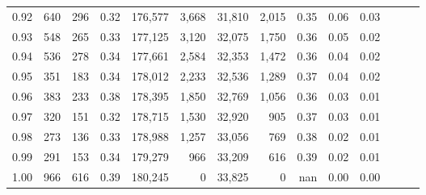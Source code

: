 \begin{tabular}{rrrrrrrrrrrrrr}
0.92 &    640 &  296 &  0.32 &  176,577 &    3,668 &  31,810 &   2,015 &  0.35 &  0.06 &      0.03 \\
0.93 &    548 &  265 &  0.33 &  177,125 &    3,120 &  32,075 &   1,750 &  0.36 &  0.05 &      0.02 \\
0.94 &    536 &  278 &  0.34 &  177,661 &    2,584 &  32,353 &   1,472 &  0.36 &  0.04 &      0.02 \\
0.95 &    351 &  183 &  0.34 &  178,012 &    2,233 &  32,536 &   1,289 &  0.37 &  0.04 &      0.02 \\
0.96 &    383 &  233 &  0.38 &  178,395 &    1,850 &  32,769 &   1,056 &  0.36 &  0.03 &      0.01 \\
0.97 &    320 &  151 &  0.32 &  178,715 &    1,530 &  32,920 &     905 &  0.37 &  0.03 &      0.01 \\
0.98 &    273 &  136 &  0.33 &  178,988 &    1,257 &  33,056 &     769 &  0.38 &  0.02 &      0.01 \\
0.99 &    291 &  153 &  0.34 &  179,279 &      966 &  33,209 &     616 &  0.39 &  0.02 &      0.01 \\
1.00 &    966 &  616 &  0.39 &  180,245 &        0 &  33,825 &       0 &   nan &  0.00 &      0.00 \\
\bottomrule
\end{tabular}
